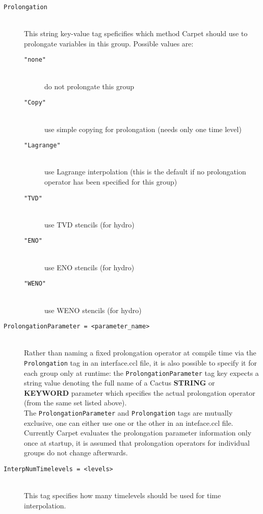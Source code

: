 \begin{description}
\item[\texttt{Prolongation}]\mbox{}\\
  This string key-value tag speficifies which method Carpet should use to
  prolongate variables in this group. Possible values are:
  \begin{description}
    \item[\texttt{"none"}]\mbox{}\\
      do not prolongate this group
    \item[\texttt{"Copy"}]\mbox{}\\
      use simple copying for prolongation (needs only one time level)
    \item[\texttt{"Lagrange"}]\mbox{}\\
      use Lagrange interpolation (this is the default if no prolongation
      operator has been specified for this group)
    \item[\texttt{"TVD"}]\mbox{}\\
      use TVD stencils (for hydro)
    \item[\texttt{"ENO"}]\mbox{}\\
      use ENO stencils (for hydro)
    \item[\texttt{"WENO"}]\mbox{}\\
      use WENO stencils (for hydro)
  \end{description}

\item[\texttt{ProlongationParameter = <parameter\_name>}]\mbox{}\\
  Rather than naming a fixed prolongation operator at compile time via the
  {\tt Prolongation} tag in an interface.ccl file, it is also possible to
  specify it for each group only at runtime: the {\tt ProlongationParameter}
  tag key expects a string value denoting the full name of a Cactus {\bf STRING}
  or {\bf KEYWORD} parameter which specifies the actual prolongation operator
  (from the same set listed above).\\
  The {\tt ProlongationParameter} and {\tt Prolongation} tags are mutually
  exclusive, one can either use one or the other in an inteface.ccl file.\\
  Currently Carpet evaluates the prolongation parameter information only once
  at startup, it is assumed that prolongation operators for individual groups
  do not change afterwards.


\item[\texttt{InterpNumTimelevels = <levels>}]\mbox{}\\
  This tag specifies how many timelevels should be used for time interpolation.

\end{description}


